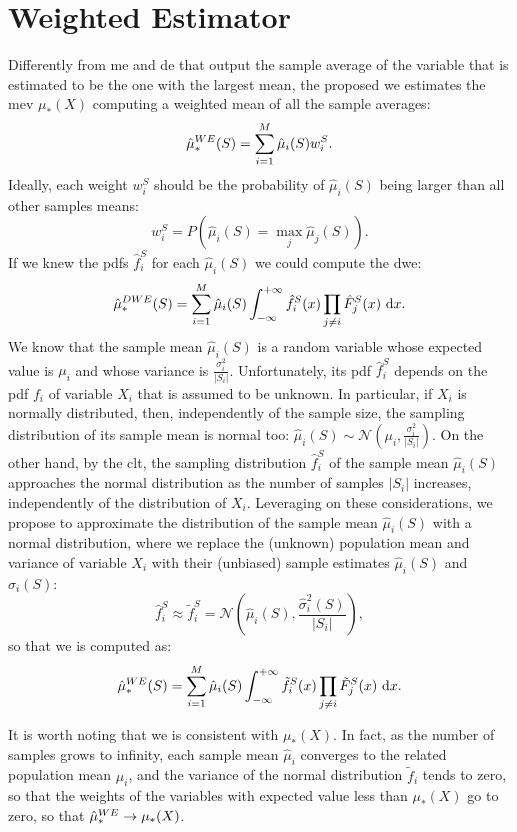 \section{Weighted Estimator}
Differently from \gls{me} and \gls{de} that output the sample average of the variable that is estimated to be the one with the largest mean, the proposed \gls{we} estimates the \gls{mev} $\mu_*(X)$ computing a weighted mean of all the sample averages:
\begin{equation}\label{E:WE}
\hat\mu_*^{WE}(S) = \sum_{i=1}^M \hat\mu_i(S) w_i^S.
\end{equation}
Ideally, each weight $w_i^S$ should be the probability of $\hat\mu_i(S)$ being larger than all other samples means:  
$$w_i^S = P\left(\hat\mu_i(S) = \max_j \hat\mu_j(S)\right).$$
If we knew the \glspl{pdf} $\hat{f}_i^S$ for each $\hat\mu_i(S)$ we could compute the \gls{dwe}:
\begin{equation}\label{E:OptimalWE}
\hat\mu_*^{DWE}(S) = \sum_{i=1}^M \hat\mu_i(S)\int_{-\infty}^{+\infty} \hat{f}_i^S(x) \prod_{j\neq i}\hat{F}_j^S(x)~\mathrm{d}x.
\end{equation}
We know that the sample mean $\hat\mu_i(S)$ is a random variable whose expected value is $\mu_i$ and whose variance is $\frac{\sigma^2_i}{|S_i|}$.
Unfortunately, its \gls{pdf} $\hat f_i^S$ depends on the \gls{pdf} $f_i$ of variable $X_i$ that is assumed to be unknown.
In particular, if $X_i$ is normally distributed, then, independently of the sample size, the sampling distribution of its sample mean is normal too: $\hat\mu_i(S)\sim\mathcal{N}\left(\mu_i,\frac{\sigma_i^2}{|S_i|}\right)$.
On the other hand, by the \gls{clt}, the sampling distribution $\hat f_i^S$ of the sample mean $\hat\mu_i(S)$ approaches the normal distribution as the number of samples $|S_i|$ increases, independently of the distribution of $X_i$.
Leveraging on these considerations, we propose to approximate the distribution of the sample mean $\hat\mu_i(S)$ with a normal distribution, where we replace the (unknown) population mean and variance of variable $X_i$ with their (unbiased) sample estimates $\hat\mu_i(S)$ and $\hat\sigma_i(S)$:
$$\hat f_i^S \approx \tilde f_i^S = \mathcal{N}\left(\hat\mu_i(S),\frac{\hat\sigma^2_i(S)}{|S_i|}\right),$$
so that \gls{we} is computed as:
\begin{equation}\label{E:WE2}
\hat\mu_*^{WE}(S) = \sum_{i=1}^M \hat\mu_i(S)\int_{-\infty}^{+\infty} \tilde{f}_i^S(x) \prod_{j\neq i}\tilde{F}_j^S(x)~\mathrm{d}x.
\end{equation}

It is worth noting that \gls{we} is consistent with $\mu_*(X)$. In fact, as the number of samples grows to infinity, each sample mean $\hat\mu_i$ converges to the related population mean $\mu_i$, and the variance of the normal distribution $\tilde f_i$ tends to zero, so that the weights of the variables with expected value less than $\mu_*(X)$ go to zero, so that $\hat\mu_*^{WE} \rightarrow \mu_*(X)$.

